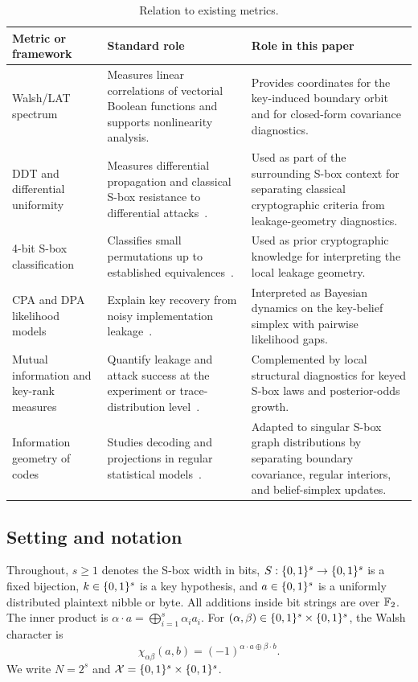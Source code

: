 \begin{table}[t]
\centering
\caption{Relation to existing metrics.}
\label{tab:sota-positioning}
\footnotesize
\setlength{\tabcolsep}{3pt}
\begin{tabular}{@{}p{}p{}p{}@{}}
\toprule
Metric or framework & Standard role & Role in this paper \\
\midrule
Walsh/LAT spectrum & Measures linear correlations of vectorial Boolean
functions and supports nonlinearity analysis. & Provides coordinates for the
key-induced boundary orbit and for closed-form covariance diagnostics. \\
DDT and differential uniformity & Measures differential propagation and
classical S-box resistance to differential attacks~\cite{nyberg1994differentially}. &
Used as part of the surrounding S-box context for separating classical
cryptographic criteria from leakage-geometry diagnostics. \\
4-bit S-box classification & Classifies small permutations up to established
equivalences~\cite{leander2007classification}. & Used as prior cryptographic
knowledge for interpreting the local leakage geometry. \\
CPA and DPA likelihood models & Explain key recovery from noisy implementation
leakage~\cite{kocher1999differential,brier2004correlation}. & Interpreted as
Bayesian dynamics on the key-belief simplex with pairwise likelihood gaps. \\
Mutual information and key-rank measures & Quantify leakage and attack success
at the experiment or trace-distribution level~\cite{standaert2009unified,veyrat2009adaptive}. &
Complemented by local structural diagnostics for keyed S-box laws and
posterior-odds growth. \\
Information geometry of codes & Studies decoding and projections in regular
statistical models~\cite{ikeda2004information}. & Adapted to singular S-box
graph distributions by separating boundary covariance, regular interiors, and
belief-simplex updates. \\
\bottomrule
\end{tabular}
\end{table}

\subsection{Setting and notation}

Throughout, $s\geq1$ denotes the S-box width in bits,
$S:\{0,1\}^{s}\to\{0,1\}^{s}$ is a fixed bijection, $k\in\{0,1\}^{s}$ is a key hypothesis, and
$a\in\{0,1\}^{s}$ is a uniformly distributed plaintext nibble or byte.  All additions
inside bit strings are over $\mathbb{F}_2$.  The inner product is
$\alpha\cdot a=\bigoplus_{i=1}^s \alpha_i a_i$.  For
$(\alpha,\beta)\in\{0,1\}^{s}\times\{0,1\}^{s}$, the Walsh character is
\[
  \chi_{\alpha\beta}(a,b)=(-1)^{\alpha\cdot a\oplus\beta\cdot b}.
\]
We write $N=2^s$ and $\mathcal X=\{0,1\}^{s}\times\{0,1\}^{s}$.

